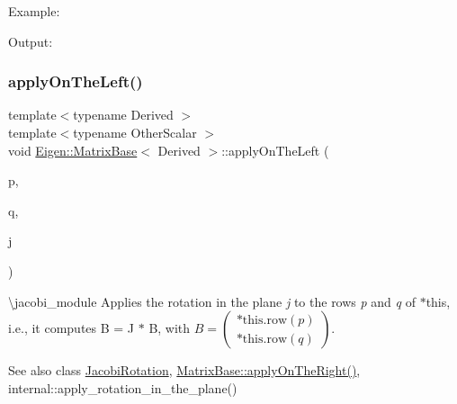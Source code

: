 Example\+: 
\begin{DoxyCodeInclude}{0}
\end{DoxyCodeInclude}
 Output\+: 
\begin{DoxyVerbInclude}
\end{DoxyVerbInclude}
 \mbox{\label{class_eigen_1_1_matrix_base_ae669131f6e18f7e8f06fae271754f435}} 
\subsubsection{\texorpdfstring{applyOnTheLeft()}{applyOnTheLeft()}\hspace{0.1cm}{\footnotesize\ttfamily [2/2]}}
{\footnotesize\ttfamily template$<$typename Derived $>$ \\
template$<$typename Other\+Scalar $>$ \\
void \mbox{\hyperlink{class_eigen_1_1_matrix_base}{Eigen\+::\+Matrix\+Base}}$<$ Derived $>$\+::apply\+On\+The\+Left (\begin{DoxyParamCaption}\item[{Index}]{p,  }\item[{Index}]{q,  }\item[{const \mbox{\hyperlink{class_eigen_1_1_jacobi_rotation}{Jacobi\+Rotation}}$<$ Other\+Scalar $>$ \&}]{j }\end{DoxyParamCaption})\hspace{0.3cm}{\ttfamily [inline]}}

\textbackslash{}jacobi\+\_\+module Applies the rotation in the plane {\itshape j} to the rows {\itshape p} and {\itshape q} of {\ttfamily $\ast$this}, i.\+e., it computes B = J $\ast$ B, with $ B = \left ( \begin{array}{cc} \text{*this.row}(p) \\ \text{*this.row}(q) \end{array} \right ) $.

\begin{DoxySeeAlso}{See also}
class \mbox{\hyperlink{class_eigen_1_1_jacobi_rotation}{Jacobi\+Rotation}}, \mbox{\hyperlink{class_eigen_1_1_matrix_base_a45d91752925d2757fc8058a293b15462}{Matrix\+Base\+::apply\+On\+The\+Right()}}, internal\+::apply\+\_\+rotation\+\_\+in\+\_\+the\+\_\+plane() 
\end{DoxySeeAlso}
\mbox{\label{class_eigen_1_1_matrix_base_a45d91752925d2757fc8058a293b15462}} 
